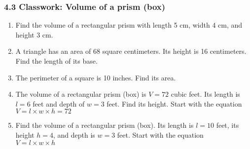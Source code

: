 

\fancyhead[LE]{\thepage}



\subsubsection*{4.3 Classwork: Volume of a prism (box)}
\begin{enumerate}
\item Find the volume of a rectangular prism with length 5 cm, width 4 cm, and height 3 cm. \vspace{1cm}

\item A triangle has an area of 68 square centimeters. Its height is 16 centimeters. Find the length of its base. \vspace{3cm}

\item The perimeter of a square is 10 inches. Find its area. \vspace{4cm}

\item The volume of a rectangular prism (box) is $V=72$ cubic feet. Its length is $l=6$ feet and depth of $w=3$ feet. Find its height. Start with the equation \\[0.5cm]
$V = l \times w \times h = 72$
  \begin{flushright}
  \end{flushright}

\item Find the volume of a rectangular prism (box). Its length is $l=10$ feet, its height $h=4$, and depth is $w=3$ feet. Start with the equation \\[0.5cm]
$V = l \times w \times h$
  \begin{flushright}
  \end{flushright}


\end{enumerate}
